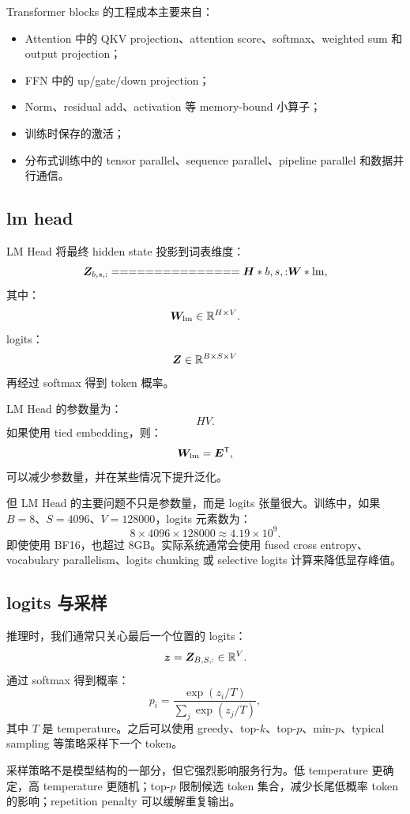 Transformer blocks 的工程成本主要来自：

\begin{itemize}
\item Attention 中的 QKV projection、attention score、softmax、weighted sum 和 output projection；
\item FFN 中的 up/gate/down projection；
\item Norm、residual add、activation 等 memory-bound 小算子；
\item 训练时保存的激活；
\item 分布式训练中的 tensor parallel、sequence parallel、pipeline parallel 和数据并行通信。
\end{itemize}

\subsection{lm head}
\label{subsec:lm-head}

LM Head 将最终 hidden state 投影到词表维度：
\[
\mat{Z}_{b,s,:}
===============

\mat{H}*{b,s,:}\mat{W}*{\mathrm{lm}},
\]
其中：
\[
\bm{W}_{\mathrm{lm}}\in\mathbb{R}^{H\times V}.
\]
logits：
\[
\bm{Z}\in\mathbb{R}^{B\times S\times V}
\]
再经过 softmax 得到 token 概率。

LM Head 的参数量为：
\[
HV.
\]
如果使用 tied embedding，则：
\[
\bm{W}_{\mathrm{lm}}=\bm{E}^{\mathsf{T}},
\]
可以减少参数量，并在某些情况下提升泛化。

但 LM Head 的主要问题不只是参数量，而是 logits 张量很大。训练中，如果 $B=8$、$S=4096$、$V=128000$，logits 元素数为：
\[
8\times 4096\times 128000\approx 4.19\times 10^9.
\]
即使使用 BF16，也超过 $8$GB。实际系统通常会使用 fused cross entropy、vocabulary parallelism、logits chunking 或 selective logits 计算来降低显存峰值。

\subsection{logits 与采样}
\label{subsec:logits-and-sampling}

推理时，我们通常只关心最后一个位置的 logits：
\[
\bm{z}=\bm{Z}_{B,S,:}\in\mathbb{R}^{V}.
\]
通过 softmax 得到概率：
\[
p_i=\frac{\exp(z_i/T)}{\sum_j\exp(z_j/T)},
\]
其中 $T$ 是 temperature。之后可以使用 greedy、top-$k$、top-$p$、min-$p$、typical sampling 等策略采样下一个 token。

采样策略不是模型结构的一部分，但它强烈影响服务行为。低 temperature 更确定，高 temperature 更随机；top-$p$ 限制候选 token 集合，减少长尾低概率 token 的影响；repetition penalty 可以缓解重复输出。

